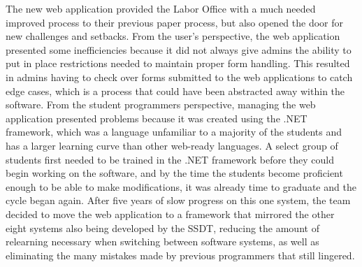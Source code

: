 The new web application provided the Labor Office with a much needed improved process to their previous paper process, but also opened the door for new challenges and setbacks. From the user's perspective, the web application presented some inefficiencies because it did not always give admins the ability to put in place restrictions needed to maintain proper form handling. This resulted in admins having to check over forms submitted to the web applications to catch edge cases, which is a process that could have been abstracted away within the software. From the student programmers perspective, managing the web application presented problems because it was created using the .NET framework, which was a language unfamiliar to a majority of the students and has a larger learning curve than other web-ready languages. A select group of students first needed to be trained in the .NET framework before they could begin working on the software, and by the time the students become proficient enough to be able to make modifications, it was already time to graduate and the cycle began again. After five years of slow progress on this one system, the team decided to move the web application to a framework that mirrored the other eight systems also being developed by the SSDT, reducing the amount of relearning necessary when switching between software systems, as well as eliminating the many mistakes made by previous programmers that still lingered.

